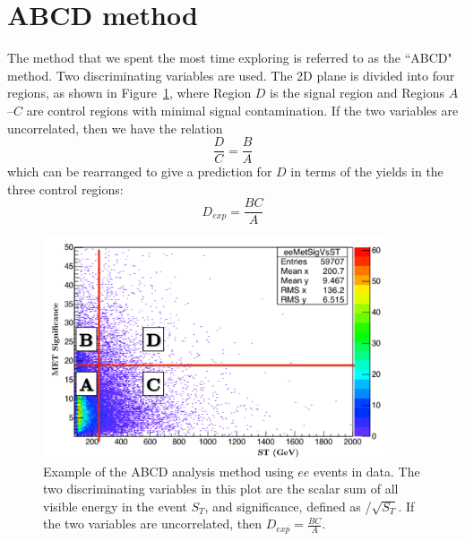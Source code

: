 \section{ABCD method}
The method that we spent the most time exploring is referred to as the ``ABCD" method.
Two discriminating variables are used. The 2D plane is divided into four regions,
as shown in Figure~\ref{fig:ABCD}, where Region $D$ is the signal region and 
Regions $A$--$C$ are control regions with minimal signal contamination.
If the two variables are uncorrelated, then we have the relation
\begin{equation}
\frac{D}{C} = \frac{B}{A}
\end{equation}
which can be rearranged to give a prediction for $D$ in terms of the yields 
in the three control regions:
\begin{equation}
D_{exp}= \frac{BC}{A}
\end{equation}

\begin{figure}[h]
\begin{center}
\includegraphics[width=0.9\textwidth]{Figures/Appendix/ABCD_demo.pdf}
\end{center}
\caption{Example of the ABCD analysis method using $ee$ events in data. The two discriminating variables in this plot
are the scalar sum of all visible energy in the event $S_T$, and \ETmiss significance, defined as \ETmiss/$\sqrt{S_T}$. If the two 
variables are uncorrelated, then $D_{exp}= \frac{BC}{A}$.}
\label{fig:ABCD}
\end{figure}

